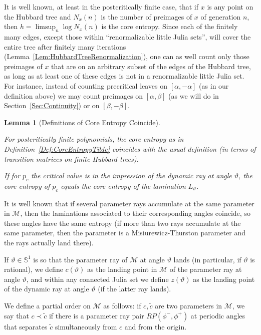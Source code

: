 \documentclass[12pt]{amsart}
\newcommand{\M}{\mathscr M}
\newcommand{\Circle}{\mathbb S^1}
\newcommand{\0}{\texttt{0}}
\newcommand{\1}{\texttt{1}}
\newtheorem{lemma}[theorem]{Lemma}
\theoremstyle{definition}
\numberwithin{equation}{section}
\renewcommand{\theta}{\vartheta}
\newcommand{\lineclear}{\rule{0pt}{2pt}\newline}
\begin{document}
It is well known, at least in the postcritically finite case, that if $x$ is any point on the Hubbard tree and $N_x(n)$ is the number of preimages of $x$ of generation $n$, then $h=\limsup_n \log N_x(n)$ is the core entropy. Since each of the finitely many edges, except those within ``renormalizable little Julia sets'', will cover the entire tree after finitely many iterations (Lemma~\ref{Lem:HubbardTreeRenormalization}), one can as well count only those preimages of $x$ that are on an arbitrary subset of the edges of the Hubbard tree, as long as at least one of these edges is not in a renormalizable little Julia set. For instance, instead of counting precritical leaves on $[\alpha,-\alpha]$ (as in our definition above) we may count preimages on $[\alpha,\beta]$ (as we will do in Section~\ref{Sec:Continuity}) or on $[\beta,-\beta]$. 





\begin{lemma}[Definitions of Core Entropy Coincide]
\label{Lem:defEntropy} \lineclear
For postcritically finite polynomials, the core entropy as in Definition~\ref{Def:CoreEntropyTilde} coincides with the usual definition (in terms of transition matrices on finite Hubbard trees). 

If for $p_c$ the critical value is in the impression of the dynamic ray at angle $\theta$,  the core entropy of $p_c$ equals the core entropy of the lamination $L_\theta$. 
\end{lemma}

It is well known that if several parameter rays accumulate at the same parameter in $\M$, then the laminations associated to their corresponding angles coincide, so these angles have the same entropy (if more than two rays accumulate at the same parameter, then the parameter is a Misiurewicz-Thurston parameter and the rays actually land there). 

If $\theta\in\Circle$ is so that the parameter ray of $\M$ at angle $\theta$ lands (in particular, if $\theta$ is rational), we define $c(\theta)$ as the landing point in $\M$ of the parameter ray at angle $\theta$, and within any connected Julia set we define $z(\theta)$ as the landing point of the dynamic ray at angle $\theta$ (if the latter ray lands). 



We define a partial order on $\M$ as follows: if $c,\tilde c$ are two parameters in $\M$, we say that $c\prec \tilde c$ if there is a parameter ray pair $RP(\phi^-,\phi^+)$ at periodic angles that separates $\tilde c$ simultaneously from $c$ and from the origin. 
\end{document}
